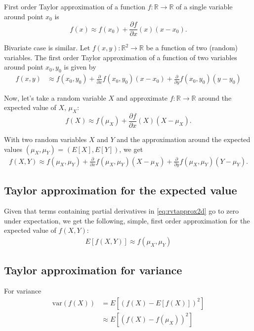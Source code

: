 \documentclass{article}
\begin{document}
First order Taylor approximation of a function $f: \mathbb{R} \rightarrow \mathbb{R}$ of a single variable around point $x_0$ is
\begin{equation*}
    f(x) \approx f(x_0) + \frac{\partial f}{\partial x}(x)(x-x_0) \label{eq:tapprox1d}.
\end{equation*}

Bivariate case is similar. Let $f(x, y): \mathbb{R}^2 \rightarrow \mathbb{R}$ be a function of two (random) variables. The first order Taylor approximation of a function of two variables around point $x_0, y_0$ is given by
\begin{align*}
    f(x, y) &\approx f(x_0, y_0) + \frac{\partial }{\partial x} f(x_0, y_0) (x - x_0) + \frac{\partial }{\partial y} f(x_0, y_0) (y - y_0) \label{eq:tapprox2d}
\end{align*}

Now, let's take a random variable $X$ and approximate $f: \mathbb{R} \rightarrow \mathbb{R}$ around the expected value of $X$, $\mu_X$:
\begin{equation}
    f(X) \approx f(\mu_X) + \frac{\partial f}{\partial x}(X)(X-\mu_X) \label{eq:rvtapprox1d}.
\end{equation}

With two random variables $X$ and $Y$ and the approximation around the expected values $(\mu_X, \mu_Y)$ = $(E[X], E[Y])$, we get
\begin{align}
    f(X, Y) \approx f(\mu_X, \mu_Y) + \frac{\partial }{\partial x} f(\mu_X, \mu_Y) (X - \mu_X) + \frac{\partial }{\partial y} f(\mu_X, \mu_Y) (Y - \mu_Y) \label{eq:rvtapprox2d}.
\end{align}

\subsection{Taylor approximation for the expected value}
Given that terms containing partial derivatives in \eqref{eq:rvtapprox2d} go to zero under expectation, we get the following, simple, first order approximation for the expected value of $f(X, Y)$:
\begin{align}
    E[f(X, Y)] \approx f(\mu_X, \mu_Y) \label{eapprox}
\end{align}

\subsection{Taylor approximation for variance}
For variance
\begin{align}
    \text{var}(f(X)) &= E\left[ \left(f(X) - E[f(X)] \right)^2 \right] \nonumber \\
    &\approx E\left[ \left( f(X) - f(\mu_X) \right)^2 \right] \nonumber
\end{align}
\end{document}
